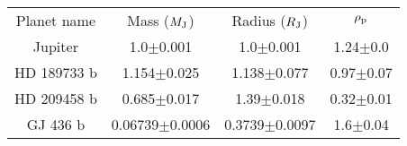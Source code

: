 \begin{table}
\begin{tabular}{cccc}
Planet name & Mass ($M_{\rm J}$) & Radius ($R_{\rm J}$) & $\rho_{\rm p}$ \\
Jupiter & 1.0$\pm$0.001 & 1.0$\pm$0.001 & 1.24$\pm$0.0 \\
HD 189733 b & 1.154$\pm$0.025 & 1.138$\pm$0.077 & 0.97$\pm$0.07 \\
HD 209458 b & 0.685$\pm$0.017 & 1.39$\pm$0.018 & 0.32$\pm$0.01 \\
GJ 436 b & 0.06739$\pm$0.0006 & 0.3739$\pm$0.0097 & 1.6$\pm$0.04 \\
\end{tabular}
\end{table}
